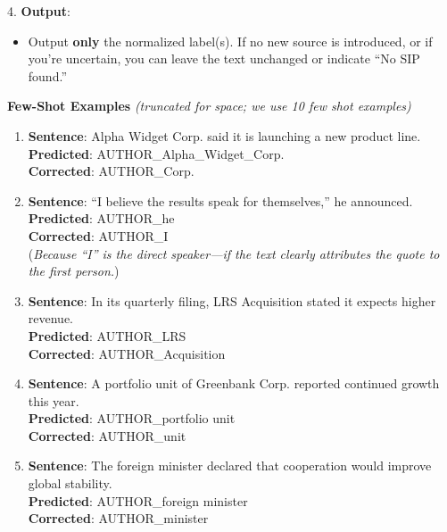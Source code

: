 \begin{figure*}[!ht]
\begin{tcolorbox}[
    width=\textwidth,
    colback=white,
    colframe=black,
    arc=4mm,
    boxrule=0.5pt,
    left=2mm,
    right=2mm,
    top=2mm,
    bottom=2mm,
    fonttitle=\bfseries,
    ]
\begin{tcolorbox}[
    colback=Periwinkle!20,
    boxrule=0pt,
    colframe=white,
    left=0pt,
    right=0pt,
    top=0pt,
    bottom=0pt,
    ]
4. \textbf{Output}:
   \begin{itemize}[noitemsep, leftmargin=15pt]
      \item Output \textbf{only} the normalized label(s). If no new source is introduced, or if you're uncertain, you can leave the text unchanged or indicate ``No SIP found.''
   \end{itemize}
\end{tcolorbox}

\bigskip

\textbf{Few-Shot Examples} \textit{(truncated for space; we use 10 few shot examples)}

\begin{enumerate}[noitemsep]
   \item \textbf{Sentence}: Alpha Widget Corp. said it is launching a new product line.\\
         \textbf{Predicted}: AUTHOR\_Alpha\_Widget\_Corp.\\
         \textbf{Corrected}: AUTHOR\_Corp.
   \item \textbf{Sentence}: ``I believe the results speak for themselves,'' he announced.\\
         \textbf{Predicted}: AUTHOR\_he\\
         \textbf{Corrected}: AUTHOR\_I\\
         (\textit{Because ``I'' is the direct speaker—if the text clearly attributes the quote to the first person.})
   \item \textbf{Sentence}: In its quarterly filing, LRS Acquisition stated it expects higher revenue.\\
         \textbf{Predicted}: AUTHOR\_LRS\\
         \textbf{Corrected}: AUTHOR\_Acquisition
   \item \textbf{Sentence}: A portfolio unit of Greenbank Corp. reported continued growth this year.\\
         \textbf{Predicted}: AUTHOR\_portfolio unit\\
         \textbf{Corrected}: AUTHOR\_unit
   \item \textbf{Sentence}: The foreign minister declared that cooperation would improve global stability.\\
         \textbf{Predicted}: AUTHOR\_foreign minister\\
         \textbf{Corrected}: AUTHOR\_minister
\end{enumerate}
\begin{tcolorbox}[
    colback=SkyBlue!10,
    boxrule=0pt,
    colframe=white,
    left=0pt,
    right=0pt,
    top=0pt,
    bottom=0pt,
    ]

\end{tcolorbox}
\end{tcolorbox}
\end{figure*}

